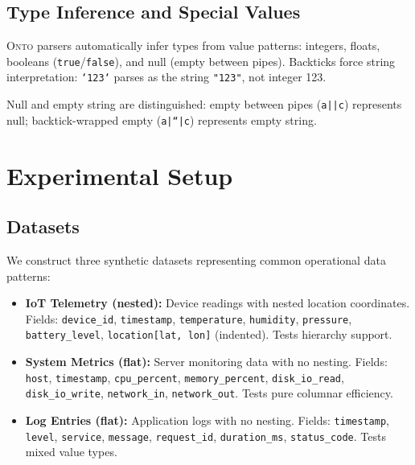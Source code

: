 \documentclass[10pt,twocolumn]{article}
\newcommand{\onto}{\textsc{Onto}\xspace}
\begin{document}
\subsection{Type Inference and Special Values}

\onto parsers automatically infer types from value patterns: integers, floats, booleans (\texttt{true}/\texttt{false}), and null (empty between pipes). Backticks force string interpretation: \texttt{`123`} parses as the string \texttt{"123"}, not integer 123.

Null and empty string are distinguished: empty between pipes (\texttt{a||c}) represents null; backtick-wrapped empty (\texttt{a|``|c}) represents empty string.

\section{Experimental Setup}

\subsection{Datasets}

We construct three synthetic datasets representing common operational data patterns:

\begin{itemize}[leftmargin=*,itemsep=0.1em]
    \item \textbf{IoT Telemetry (nested):} Device readings with nested location coordinates. Fields: \texttt{device\_id}, \texttt{timestamp}, \texttt{temperature}, \texttt{humidity}, \texttt{pressure}, \texttt{battery\_level}, \texttt{location[lat, lon]} (indented). Tests hierarchy support.
    
    \item \textbf{System Metrics (flat):} Server monitoring data with no nesting. Fields: \texttt{host}, \texttt{timestamp}, \texttt{cpu\_percent}, \texttt{memory\_percent}, \texttt{disk\_io\_read}, \texttt{disk\_io\_write}, \texttt{network\_in}, \texttt{network\_out}. Tests pure columnar efficiency.
    
    \item \textbf{Log Entries (flat):} Application logs with no nesting. Fields: \texttt{timestamp}, \texttt{level}, \texttt{service}, \texttt{message}, \texttt{request\_id}, \texttt{duration\_ms}, \texttt{status\_code}. Tests mixed value types.
\end{itemize}
\end{document}
